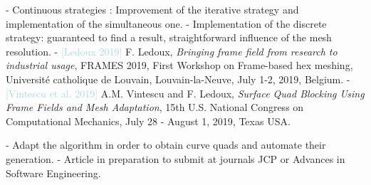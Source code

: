 \documentclass[a0paper,portrait, fontscale=0.30]{baposter}
\begin{document}
\begin{poster}
{\begin{minipage}[HT!]{0.62\linewidth}
\begin{tcolorbox}[colframe=gray,boxrule=0.01pt,left=0mm,right=0mm,title=\Large Conclusions]
 - Continuous strategies : Improvement of the iterative strategy and implementation of the simultaneous one.
 \newline
 - Implementation of the discrete strategy: guaranteed to find a result, straightforward influence of the mesh resolution.%
 \newline
 - \footnotesize \textcolor{lightblue}{[Ledoux 2019]} F. Ledoux, \textit{Bringing frame field from research to industrial usage}, FRAMES 2019, First Workshop on Frame-based hex meshing, Université catholique de Louvain, Louvain-la-Neuve, July 1-2, 2019, Belgium.
  \newline
 - \footnotesize \textcolor{lightblue}{[Vintescu et al. 2019]} A.M. Vintescu and F. Ledoux, \textit{Surface Quad Blocking Using Frame Fields and Mesh Adaptation}, 15th U.S. National Congress on Computational Mechanics, July 28 - August 1, 2019, Texas USA.
\vspace{-0.2cm}
\end{tcolorbox}
\vspace{-0.2cm}
\end{minipage}
\hspace{0.005\linewidth}
\begin{minipage}[HT!]{0.37\linewidth}
\begin{tcolorbox}[colframe=gray,boxrule=0.005pt,left=0mm,right=0mm,title=\Large Perspectives]
\noindent
- Adapt the algorithm in order to obtain curve quads and automate their generation.
\newline
- Article in preparation to submit at journals JCP or Advances in Software Engineering.
\end{tcolorbox}
\end{minipage}
}
\end{poster}
\end{document}
